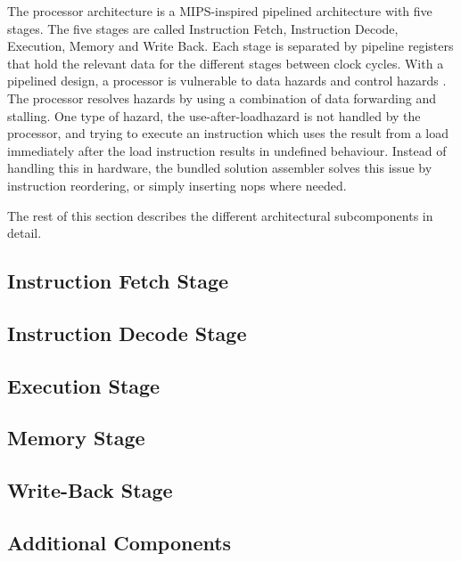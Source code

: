 
The processor architecture is a MIPS-inspired pipelined architecture with five stages.
The five stages are called Instruction Fetch, Instruction Decode, Execution, Memory and Write Back.
Each stage is separated by pipeline registers that hold the relevant data for the different stages between clock cycles.
With a pipelined design, a processor is vulnerable to data hazards and control hazards .
The processor resolves hazards by using a combination of data forwarding and stalling.
One type of hazard, the use-after-load\cn hazard is not handled by the processor, and trying to execute an instruction which uses the result from a load immediately after the load instruction results in undefined behaviour.
Instead of handling this in hardware, the bundled solution assembler solves this issue by instruction reordering, or simply inserting nops where needed.


The rest of this section describes the different architectural subcomponents in detail.

\newpage
\subsection{Instruction Fetch Stage}
    

\newpage
\subsection{Instruction Decode Stage}
    

\newpage
\subsection{Execution Stage}
    

\newpage
\subsection{Memory Stage}
    

\newpage
\subsection{Write-Back Stage}
    

\newpage
\subsection{Additional Components}
    

